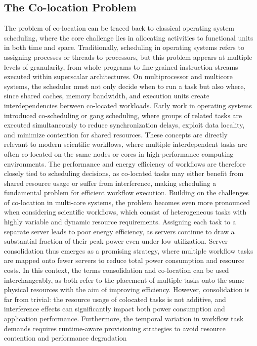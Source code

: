 \subsection{The Co-location Problem}
\label{sec:background_colocation}
The problem of co-location can be traced back to classical operating system scheduling, where the core challenge lies in allocating activities to functional units in both time and space. Traditionally, scheduling in operating systems refers to assigning processes or threads to processors, but this problem appears at multiple levels of granularity, from whole programs to fine-grained instruction streams executed within superscalar architectures. On multiprocessor and multicore systems, the scheduler must not only decide when to run a task but also where, since shared caches, memory bandwidth, and execution units create interdependencies between co-located workloads. Early work in operating systems introduced co-scheduling or gang scheduling, where groups of related tasks are executed simultaneously to reduce synchronization delays, exploit data locality, and minimize contention for shared resources. These concepts are directly relevant to modern scientific workflows, where multiple interdependent tasks are often co-located on the same nodes or cores in high-performance computing environments. The performance and energy efficiency of workflows are therefore closely tied to scheduling decisions, as co-located tasks may either benefit from shared resource usage or suffer from interference, making scheduling a fundamental problem for efficient workflow execution.
Building on the challenges of co-location in multi-core systems, the problem becomes even more pronounced when considering scientific workflows, which consist of heterogeneous tasks with highly variable and dynamic resource requirements. Assigning each task to a separate server leads to poor energy efficiency, as servers continue to draw a substantial fraction of their peak power even under low utilization. Server consolidation thus emerges as a promising strategy, where multiple workflow tasks are mapped onto fewer servers to reduce total power consumption and resource costs. In this context, the terms consolidation and co-location can be used interchangeably, as both refer to the placement of multiple tasks onto the same physical resources with the aim of improving efficiency. However, consolidation is far from trivial: the resource usage of colocated tasks is not additive, and interference effects can significantly impact both power consumption and application performance. Furthermore, the temporal variation in workflow task demands requires runtime-aware provisioning strategies to avoid resource contention and performance degradation \cite{5644899}

